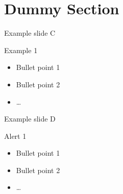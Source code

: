\section{Dummy Section}
\begin{frame}{Example slide C}
\begin{exampleblock}{Example 1}
\begin{itemize}
\item Bullet point 1
\pause
\item Bullet point 2
\item \dots
\end{itemize}
\end{exampleblock}
\end{frame}

\begin{frame}{Example slide D}
\begin{alertblock}{Alert 1}
\begin{itemize}
\item Bullet point 1
\pause
\item Bullet point 2
\item \dots
\end{itemize}
\end{alertblock}
\end{frame}
